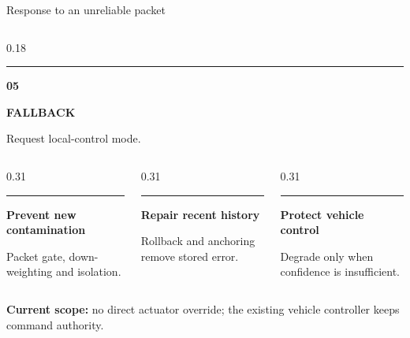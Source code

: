 \documentclass[aspectratio=169,11pt,xcolor=table]{beamer}
\newcommand{\sourcefoot}[1]{%
}
\begin{document}
\begin{frame}{Response to an unreliable packet}
\begin{columns}[T,onlytextwidth]
    \begin{column}{0.18\textwidth}
      {\color{BrandBlue}\rule{\linewidth}{0.10cm}}\par\vspace{0.08cm}
      {\color{BrandBlue}\fontsize{16}{18}\selectfont\bfseries 05}\par
      {\fontsize{9.4}{11.2}\selectfont\bfseries FALLBACK}\par
      {\color{Muted}\fontsize{7.3}{8.8}\selectfont Request local-control mode.}
    \end{column}
  \end{columns}
  \vspace{0.24cm}
  \begin{columns}[T,onlytextwidth]
    \begin{column}{0.31\textwidth}
      {\color{BrandCyan}\rule{\linewidth}{0.06cm}}\par\vspace{0.05cm}
      {\fontsize{8.4}{10}\selectfont\bfseries Prevent new contamination}\par
      {\color{Muted}\fontsize{7.3}{8.8}\selectfont Packet gate, down-weighting and isolation.}
    \end{column}
    \begin{column}{0.31\textwidth}
      {\color{BrandMagenta}\rule{\linewidth}{0.06cm}}\par\vspace{0.05cm}
      {\fontsize{8.4}{10}\selectfont\bfseries Repair recent history}\par
      {\color{Muted}\fontsize{7.3}{8.8}\selectfont Rollback and anchoring remove stored error.}
    \end{column}
    \begin{column}{0.31\textwidth}
      {\color{BrandBlue}\rule{\linewidth}{0.06cm}}\par\vspace{0.05cm}
      {\fontsize{8.4}{10}\selectfont\bfseries Protect vehicle control}\par
      {\color{Muted}\fontsize{7.3}{8.8}\selectfont Degrade only when confidence is insufficient.}
    \end{column}
  \end{columns}
  \vspace{0.12cm}
  {\color{Warn}\fontsize{8.5}{10.2}\selectfont\bfseries Current scope:}\hspace{0.06cm}%
  {\fontsize{8.5}{10.2}\selectfont no direct actuator override; the existing vehicle controller keeps command authority.}
  \sourcefoot{Final manuscript packet gate, rollback and trust-gated ACC/CACC}
\end{frame}
\end{document}
